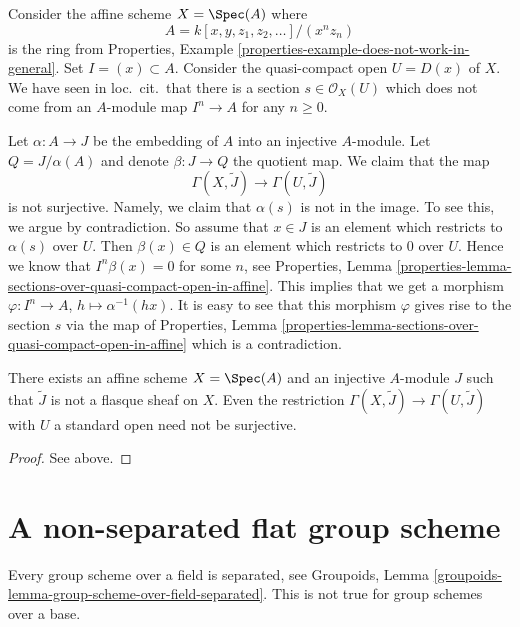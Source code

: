\medskip\noindent
Consider the affine scheme $X = \Spec(A)$ where
$$
A = k[x, y, z_1, z_2, \ldots]/(x^nz_n)
$$
is the ring from
Properties, Example \ref{properties-example-does-not-work-in-general}.
Set $I = (x) \subset A$. Consider the quasi-compact open $U = D(x)$ of $X$.
We have seen in loc.\ cit.\ that there is a section
$s \in \mathcal{O}_X(U)$ which does not come from an $A$-module
map $I^n \to A$ for any $n \geq 0$.

\medskip\noindent
Let $\alpha : A \to J$ be the embedding of $A$ into an injective $A$-module.
Let $Q = J/\alpha(A)$ and denote $\beta : J \to Q$ the quotient map.
We claim that the map
$$
\Gamma(X, \widetilde{J})
\longrightarrow
\Gamma(U, \widetilde{J})
$$
is not surjective. Namely, we claim that $\alpha(s)$ is not in the image.
To see this, we argue by contradiction. So assume that $x \in J$ is an
element which restricts to $\alpha(s)$ over $U$. Then $\beta(x) \in Q$
is an element which restricts to $0$ over $U$. Hence we know that
$I^n\beta(x) = 0$ for some $n$, see
Properties,
Lemma \ref{properties-lemma-sections-over-quasi-compact-open-in-affine}.
This implies that we get a morphism
$\varphi : I^n \to A$, $h \mapsto \alpha^{-1}(hx)$. It is easy to see that
this morphism $\varphi$ gives rise to the section $s$ via the map of
Properties,
Lemma \ref{properties-lemma-sections-over-quasi-compact-open-in-affine}
which is a contradiction.

\begin{lemma}
\label{lemma-nonflasque}
There exists an affine scheme $X = \Spec(A)$ and an injective
$A$-module $J$ such that $\widetilde{J}$ is not a flasque sheaf on $X$.
Even the restriction $\Gamma(X, \widetilde{J}) \to \Gamma(U, \widetilde{J})$
with $U$ a standard open need not be surjective.
\end{lemma}

\begin{proof}
See above.
\end{proof}





\section{A non-separated flat group scheme}
\label{section-non-separated-group-scheme}

\noindent
Every group scheme over a field is separated, see
Groupoids, Lemma \ref{groupoids-lemma-group-scheme-over-field-separated}.
This is not true for group schemes over a base.

